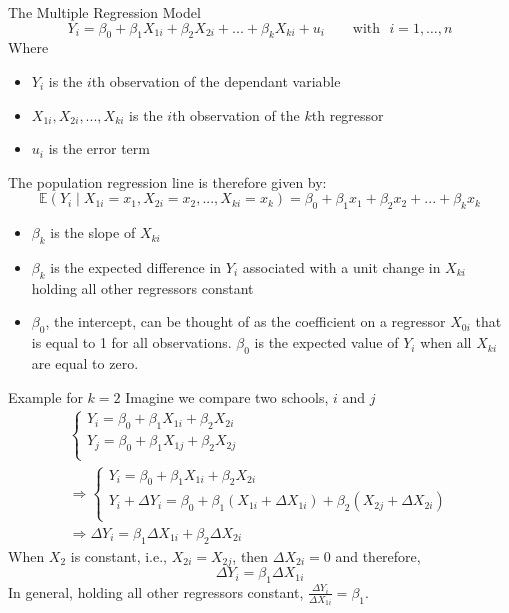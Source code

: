 \documentclass[notes,10pt, aspectratio=169]{beamer}
\begin{document}
\begin{frame}{The Multiple Regression Model }
\begin{equation*}
    Y_i = \beta_{0} + \beta_1 X_{1i} + \beta_2 X_{2i} + ... + \beta_k X_{ki} + u_i \text{~~~~~~with~~} i=1,\dots, n
\end{equation*}
Where
\begin{itemize}
    \item $Y_i$ is the $i$th observation of the dependant variable
    \item $X_{1i}, X_{2i}, ..., X_{ki}$ is the $i$th observation of the $k$th regressor
    \item $u_i$ is the error term
\end{itemize}
\vspace{.5cm}
The population regression line is therefore given by:
\begin{equation*}
     \mathbb{E}(Y_i\mid X_{1i}=x_1, X_{2i}=x_2, ..., X_{ki}=x_k) = \beta_0 + \beta_1 x_1 + \beta_2 x_2 + ... + \beta_k x_k 
\end{equation*}
\begin{itemize}
    \item $\beta_k$ is the slope of $X_{ki}$
    \item $\beta_k$ is the expected difference in $Y_i$ associated with a unit change in $X_{ki}$ holding all other regressors constant
    \item $\beta_0$, the intercept, can be thought of as the coefficient on a regressor $X_{0i}$ that is equal to 1 for all observations. $\beta_0$ is the expected value of $Y_i$ when all $X_{ki}$ are equal to zero.
\end{itemize}

\end{frame}


\begin{frame}{Example for $k=2$}
Imagine we compare two schools, $i$ and $j$
\begin{eqnarray*}
\begin{cases}
    Y_i = \beta_{0} + \beta_1 X_{1i} + \beta_2 X_{2i}\\
    Y_j = \beta_{0} + \beta_1 X_{1j} + \beta_2 X_{2j}\\
\end{cases}\\
\Rightarrow
\begin{cases}
    Y_i = \beta_{0} + \beta_1 X_{1i} + \beta_2 X_{2i}\\
    Y_i + \Delta Y_i = \beta_{0} + \beta_1 (X_{1i}+ \Delta X_{1i}) + \beta_2 (X_{2j} + \Delta X_{2i})\\
\end{cases}\\
\Rightarrow
\Delta Y_i = \beta_1 \Delta X_{1i} + \beta_2 \Delta X_{2i}
\end{eqnarray*}
When $X_2$ is constant, i.e., $X_{2i}=X_{2j}$, then $\Delta X_{2i}=0$ and therefore,
\begin{equation*}
    \Delta Y_i = \beta_1 \Delta X_{1i}
\end{equation*}
In general, holding all other regressors constant, $\frac{\Delta Y_i}{\Delta X_{1i}}= \beta_1$.
\end{frame}
\end{document}
